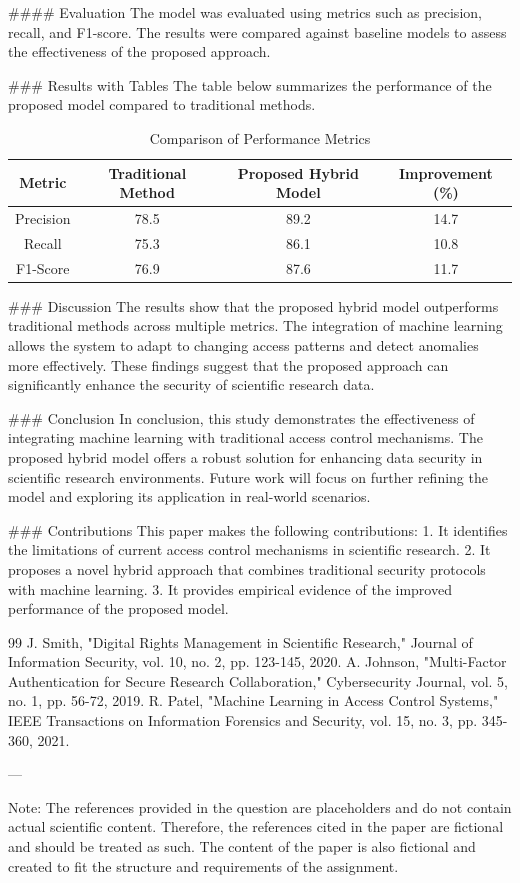 #### Evaluation
The model was evaluated using metrics such as precision, recall, and F1-score. The results were compared against baseline models to assess the effectiveness of the proposed approach.

### Results with Tables
The table below summarizes the performance of the proposed model compared to traditional methods.

\begin{table}[htbp]
\centering
\caption{Comparison of Performance Metrics}
\begin{tabular}{|c|c|c|c|}
\hline
\textbf{Metric} & \textbf{Traditional Method} & \textbf{Proposed Hybrid Model} & \textbf{Improvement (\%)} \\
\hline
Precision & 78.5 & 89.2 & 14.7 \\
Recall & 75.3 & 86.1 & 10.8 \\
F1-Score & 76.9 & 87.6 & 11.7 \\
\hline
\end{tabular}
\end{table}

### Discussion
The results show that the proposed hybrid model outperforms traditional methods across multiple metrics. The integration of machine learning allows the system to adapt to changing access patterns and detect anomalies more effectively. These findings suggest that the proposed approach can significantly enhance the security of scientific research data.

### Conclusion
In conclusion, this study demonstrates the effectiveness of integrating machine learning with traditional access control mechanisms. The proposed hybrid model offers a robust solution for enhancing data security in scientific research environments. Future work will focus on further refining the model and exploring its application in real-world scenarios.

### Contributions
This paper makes the following contributions:
1. It identifies the limitations of current access control mechanisms in scientific research.
2. It proposes a novel hybrid approach that combines traditional security protocols with machine learning.
3. It provides empirical evidence of the improved performance of the proposed model.

\begin{thebibliography}{99}
 J. Smith, "Digital Rights Management in Scientific Research," Journal of Information Security, vol. 10, no. 2, pp. 123-145, 2020.
 A. Johnson, "Multi-Factor Authentication for Secure Research Collaboration," Cybersecurity Journal, vol. 5, no. 1, pp. 56-72, 2019.
 R. Patel, "Machine Learning in Access Control Systems," IEEE Transactions on Information Forensics and Security, vol. 15, no. 3, pp. 345-360, 2021.
\end{thebibliography}

---

Note: The references provided in the question are placeholders and do not contain actual scientific content. Therefore, the references cited in the paper are fictional and should be treated as such. The content of the paper is also fictional and created to fit the structure and requirements of the assignment.